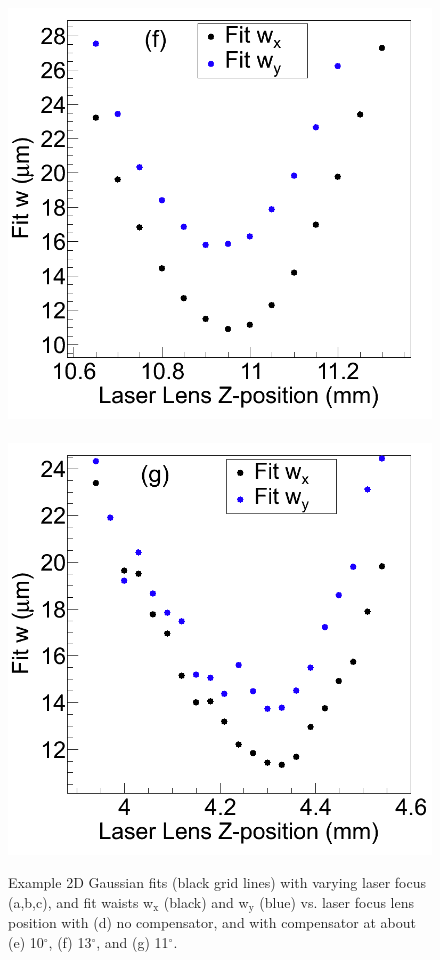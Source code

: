 \begin{figure}
                \includegraphics[width=.45\textwidth]{figures/astigcorr_curve_corr_13deg.png}
                ~
                \includegraphics[width=.45\textwidth]{figures/astigcorr_curve_corr_9-16.png}
                \caption{Example 2D Gaussian fits (black grid lines) with varying laser focus (a,b,c), and fit waists  w$_{\text{x}}$ (black) and  w$_{\text{y}}$ (blue) vs. laser focus lens position with (d) no compensator, and with compensator at about (e) 10$^{\circ}$, (f) 13$^{\circ}$, and (g) 11$^{\circ}$.}
\label{fig:astig}
\end{figure}	

